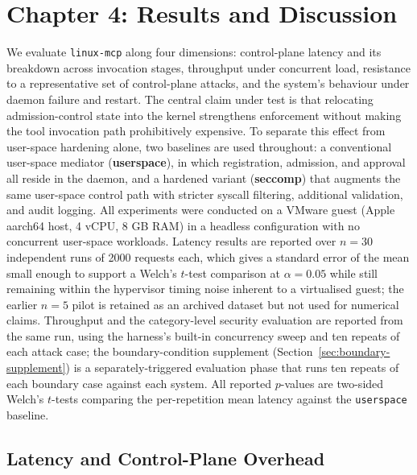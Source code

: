 \section*{Chapter 4: Results and Discussion}
\setcounter{section}{4} \setcounter{subsection}{0}
 {}


We evaluate \texttt{linux-mcp} along four dimensions: control-plane latency and its breakdown across invocation stages, throughput under concurrent load, resistance to a representative set of control-plane attacks, and the system's behaviour under daemon failure and restart.
The central claim under test is that relocating admission-control state into the kernel strengthens enforcement without making the tool invocation path prohibitively expensive.
To separate this effect from user-space hardening alone, two baselines are used throughout: a conventional user-space mediator (\textbf{userspace}), in which registration, admission, and approval all reside in the daemon, and a hardened variant (\textbf{seccomp}) that augments the same user-space control path with stricter syscall filtering, additional validation, and audit logging.
All experiments were conducted on a VMware guest (Apple aarch64 host, 4 vCPU, 8 GB RAM) in a headless configuration with no concurrent user-space workloads.
Latency results are reported over $n = 30$ independent runs of 2000 requests each, which gives a standard error of the mean small enough to support a Welch's $t$-test comparison at $\alpha = 0.05$ while still remaining within the hypervisor timing noise inherent to a virtualised guest; the earlier $n = 5$ pilot is retained as an archived dataset but not used for numerical claims.
Throughput and the category-level security evaluation are reported from the same run, using the harness's built-in concurrency sweep and ten repeats of each attack case; the boundary-condition supplement (Section~\ref{sec:boundary-supplement}) is a separately-triggered evaluation phase that runs ten repeats of each boundary case against each system.
All reported $p$-values are two-sided Welch's $t$-tests comparing the per-repetition mean latency against the \texttt{userspace} baseline.



\subsection{Latency and Control-Plane Overhead}

